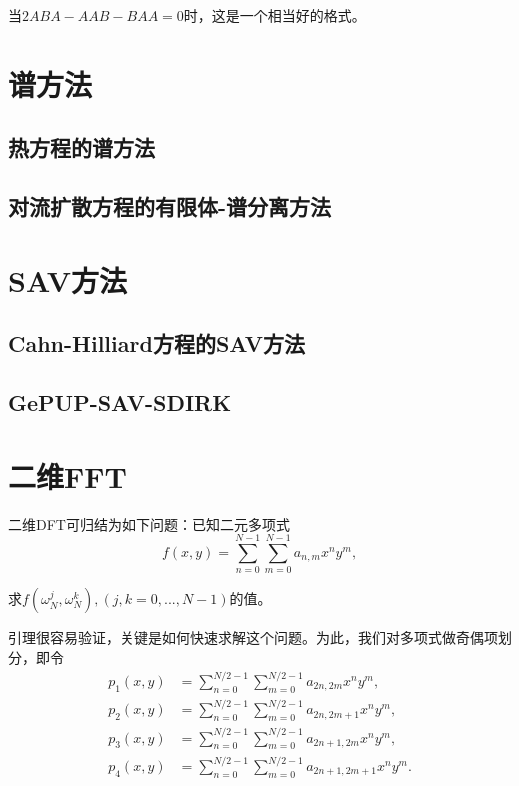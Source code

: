 \documentclass[lang=cn,10pt,bibend=bibtex]{elegantbook}
\begin{document}
当$2ABA-AAB-BAA=0$时，这是一个相当好的格式。

\vspace{5em}

\chapter{谱方法}

\section{热方程的谱方法}

\section{对流扩散方程的有限体-谱分离方法}

\chapter{SAV方法}

\section{Cahn-Hilliard方程的SAV方法}

\section{GePUP-SAV-SDIRK}

\printbibliography[heading=bibintoc,title=\ebibname]

\appendix

\chapter{二维FFT}

\begin{lemma}
    二维DFT可归结为如下问题：已知二元多项式
    \begin{equation*}
        f(x,y)=\sum_{n=0}^{N-1}\sum_{m=0}^{N-1} a_{n,m}x^ny^m,
    \end{equation*}

    求$f(\omega_N^j,\omega_N^k),(j,k=0,...,N-1)$的值。
\end{lemma}

引理很容易验证，关键是如何快速求解这个问题。为此，我们对多项式做奇偶项划分，即令
\begin{align*}
    p_1(x,y)&=\sum_{n=0}^{N/2-1}\sum_{m=0}^{N/2-1} a_{2n,2m}x^ny^m,\\
    p_2(x,y)&=\sum_{n=0}^{N/2-1}\sum_{m=0}^{N/2-1} a_{2n,2m+1}x^ny^m,\\
    p_3(x,y)&=\sum_{n=0}^{N/2-1}\sum_{m=0}^{N/2-1} a_{2n+1,2m}x^ny^m,\\
    p_4(x,y)&=\sum_{n=0}^{N/2-1}\sum_{m=0}^{N/2-1} a_{2n+1,2m+1}x^ny^m.
\end{align*}
\end{document}
